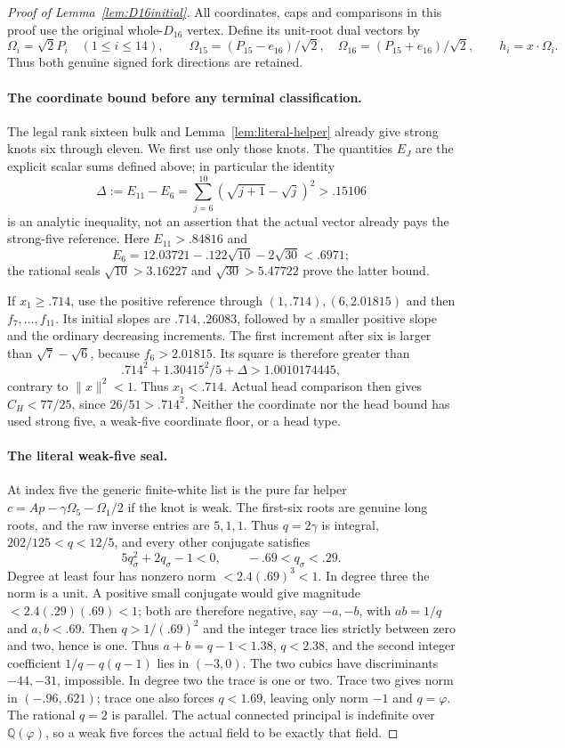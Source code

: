 \documentclass[11pt]{article}
\begin{document}
\begin{proof}[Proof of Lemma~\ref{lem:D16initial}]
All coordinates, caps and comparisons in this proof use the original
whole-$D_{16}$ vertex. Define its unit-root dual vectors by
\[
 \Omega_i=\sqrt2P_i\quad(1\le i\le14),\qquad
 \Omega_{15}=(P_{15}-e_{16})/\sqrt2,\quad
 \Omega_{16}=(P_{15}+e_{16})/\sqrt2,
 \qquad h_i=x\cdot\Omega_i.
\]
Thus both genuine signed fork directions are retained.

\paragraph{The coordinate bound before any terminal classification.}
The legal rank sixteen bulk and Lemma~\ref{lem:literal-helper} already
give strong knots six through eleven. We first use only those knots.
The quantities $E_J$ are the explicit scalar sums defined above;
in particular the identity
\[
 \Delta:=E_{11}-E_6
   =\sum_{j=6}^{10}(\sqrt{j+1}-\sqrt j)^2>.15106
\]
is an analytic inequality, not an assertion that the actual vector
already pays the strong-five reference.
Here $E_{11}>.84816$ and
\[
 E_6=12.03721-.122\sqrt{10}-2\sqrt{30}<.6971;
\]
the rational seals $\sqrt{10}>3.16227$ and $\sqrt{30}>5.47722$
prove the latter bound.

If $x_1\ge.714$, use the positive reference through
$(1,.714),(6,2.01815)$ and then $f_7,\ldots,f_{11}$.
Its initial slopes are $.714,.26083$, followed by a smaller
positive slope and the ordinary decreasing increments. The first
increment after six is larger than $\sqrt7-\sqrt6$, because
$f_6>2.01815$. Its square is therefore greater than
\[
 .714^2+1.30415^2/5+\Delta>1.0010174445,
\]
contrary to $\|x\|^2<1$. Thus $x_1<.714$.
Actual head comparison then gives $C_H<77/25$, since
$26/51>.714^2$. Neither the coordinate nor the head bound has
used strong five, a weak-five coordinate floor, or a head type.

\paragraph{The literal weak-five seal.}
At index five the generic finite-white list is the pure far helper
$c=Ap-\gamma\Omega_5-\Omega_1/2$ if the knot is weak.
The first-six roots are genuine long roots, and the raw inverse
entries are $5,1,1$. Thus $q=2\gamma$ is integral,
$202/125<q<12/5$, and every other conjugate satisfies
\[
 5q_\sigma^2+2q_\sigma-1<0,\qquad -.69<q_\sigma<.29.
\]
Degree at least four has nonzero norm $<2.4(.69)^3<1$.
In degree three the norm is a unit. A positive small conjugate would
give magnitude $<2.4(.29)(.69)<1$; both are therefore negative,
say $-a,-b$, with $ab=1/q$ and $a,b<.69$.
Then $q>1/(.69)^2$ and the integer trace lies strictly between
zero and two, hence is one. Thus $a+b=q-1<1.38$, $q<2.38$,
and the second integer coefficient $1/q-q(q-1)$ lies in $(-3,0)$.
The two cubics have discriminants $-44,-31$, impossible.
In degree two the trace is one or two. Trace two gives norm in
$(-.96,.621)$; trace one also forces $q<1.69$, leaving only norm
$-1$ and $q=\varphi$. The rational $q=2$ is parallel.
The actual connected principal is indefinite over
$\mathbb Q(\varphi)$, so a weak five forces the actual field to be
exactly that field.


\end{proof}
\end{document}
